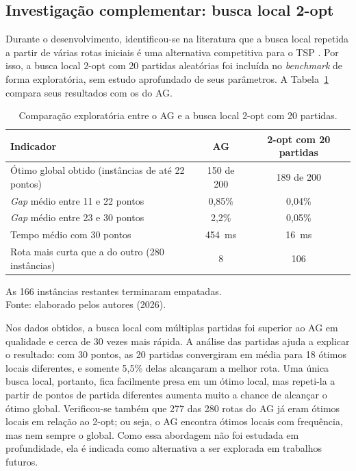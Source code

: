 \subsection{Investigação complementar: busca local 2-opt}\label{subsec:res_rotas_2opt}

Durante o desenvolvimento, identificou-se na literatura que a busca local repetida a partir de várias rotas iniciais é uma alternativa competitiva para o TSP \cite{johnson1997}. Por isso, a busca local 2-opt com 20 partidas aleatórias foi incluída no \textit{benchmark} de forma exploratória, sem estudo aprofundado de seus parâmetros. A Tabela~\ref{tab:rotas_2opt} compara seus resultados com os do AG.

\begin{table}[H]
    \centering
    \caption{Comparação exploratória entre o AG e a busca local 2-opt com 20 partidas.}
    \label{tab:rotas_2opt}
    \small
    \renewcommand{\arraystretch}{1.25}
    \begin{tabular}{lcc}
        \hline
        \textbf{Indicador} & \textbf{AG} & \textbf{2-opt com 20 partidas} \\
        \hline
        Ótimo global obtido (instâncias de até 22 pontos) & 150 de 200 & 189 de 200 \\
        \textit{Gap} médio entre 11 e 22 pontos & 0,85\% & 0,04\% \\
        \textit{Gap} médio entre 23 e 30 pontos & 2,2\% & 0,05\% \\
        Tempo médio com 30 pontos & 454~ms & 16~ms \\
        Rota mais curta que a do outro (280 instâncias) & 8 & 106 \\
        \hline
    \end{tabular}
    \par\vspace{0.15cm}
    \footnotesize As 166 instâncias restantes terminaram empatadas.\\
    Fonte: elaborado pelos autores (2026).
\end{table}

Nos dados obtidos, a busca local com múltiplas partidas foi superior ao AG em qualidade e cerca de 30 vezes mais rápida. A análise das partidas ajuda a explicar o resultado: com 30 pontos, as 20 partidas convergiram em média para 18 ótimos locais diferentes, e somente 5,5\% delas alcançaram a melhor rota. Uma única busca local, portanto, fica facilmente presa em um ótimo local, mas repeti-la a partir de pontos de partida diferentes aumenta muito a chance de alcançar o ótimo global. Verificou-se também que 277 das 280 rotas do AG já eram ótimos locais em relação ao 2-opt; ou seja, o AG encontra ótimos locais com frequência, mas nem sempre o global. Como essa abordagem não foi estudada em profundidade, ela é indicada como alternativa a ser explorada em trabalhos futuros.

